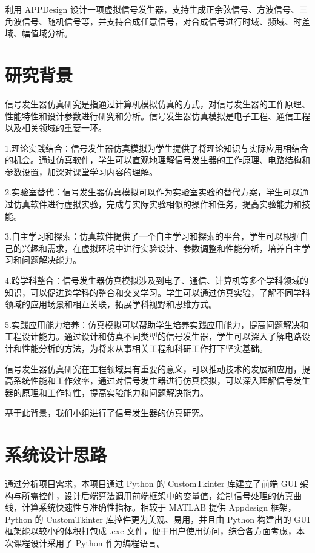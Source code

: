 \documentclass[12pt]{ctexart}
\begin{document}
利用 APPDesign 设计一项虚拟信号发生器，支持生成正余弦信号、方波信号、三角波信号、随机信号等，并支持合成任意信号，对合成信号进行时域、频域、时差域、幅值域分析。

\section{研究背景}
信号发生器仿真研究是指通过计算机模拟仿真的方式，对信号发生器的工作原理、性能特性和设计参数进行研究和分析。信号发生器仿真模拟是电子工程、通信工程以及相关领域的重要一环。

1.理论实践结合：信号发生器仿真模拟为学生提供了将理论知识与实际应用相结合的机会。通过仿真软件，学生可以直观地理解信号发生器的工作原理、电路结构和参数设置，加深对课堂学习内容的理解。

2.实验室替代：信号发生器仿真模拟可以作为实验室实验的替代方案，学生可以通过仿真软件进行虚拟实验，完成与实际实验相似的操作和任务，提高实验能力和技能。

3.自主学习和探索：仿真软件提供了一个自主学习和探索的平台，学生可以根据自己的兴趣和需求，在虚拟环境中进行实验设计、参数调整和性能分析，培养自主学习和问题解决能力。

4.跨学科整合：信号发生器仿真模拟涉及到电子、通信、计算机等多个学科领域的知识，可以促进跨学科的整合和交叉学习。学生可以通过仿真实验，了解不同学科领域的应用场景和相互关联，拓展学科视野和思维方式。

5.实践应用能力培养：仿真模拟可以帮助学生培养实践应用能力，提高问题解决和工程设计能力。通过设计和仿真不同类型的信号发生器，学生可以深入了解电路设计和性能分析的方法，为将来从事相关工程和科研工作打下坚实基础。

信号发生器仿真研究在工程领域具有重要的意义，可以推动技术的发展和应用，提高系统性能和工作效率，通过对信号发生器进行仿真模拟，可以深入理解信号发生器的原理和工作特性，提高实验能力和问题解决能力。

基于此背景，我们小组进行了信号发生器的仿真研究。

\section{系统设计思路}

通过分析项目需求，本项目通过 Python 的 CustomTkinter 库建立了前端 GUI 架构与所需控件，设计后端算法调用前端框架中的变量值，绘制信号处理的仿真曲线，计算系统快速性与准确性指标。相较于 MATLAB 提供 Appdesign 框架，Python 的 CustomTkinter 库控件更为美观、易用，并且由 Python 构建出的 GUI 框架能以较小的体积打包成 .exe 文件，便于用户使用访问，综合各方面考虑，本次课程设计采用了 Python 作为编程语言。
\end{document}
